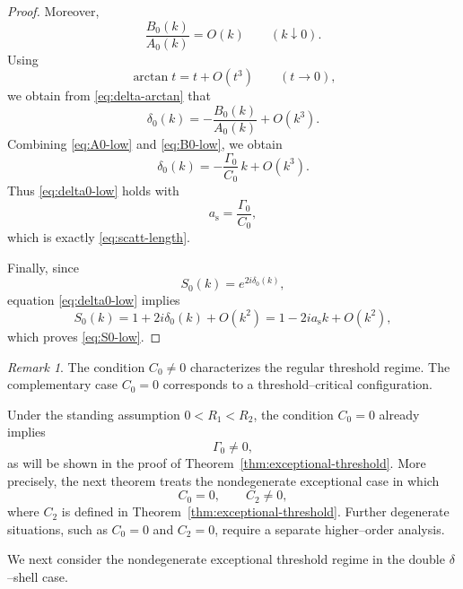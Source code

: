 \documentclass[a4paper,11pt]{article}
\numberwithin{equation}{section}
\theoremstyle{definition}
\theoremstyle{remark}
\newtheorem{rem}[thm]{Remark}
\begin{document}
\begin{proof}
Moreover,
$$
\frac{B_0(k)}{A_0(k)}=O(k)
\qquad (k\downarrow0).
$$
Using
$$
\arctan t=t+O(t^3)
\qquad (t\to0),
$$
we obtain from \eqref{eq:delta-arctan} that
\begin{equation}\label{eq:arg-expand}
\delta_0(k)
=
-\frac{B_0(k)}{A_0(k)}+O(k^3).
\end{equation}
Combining \eqref{eq:A0-low} and \eqref{eq:B0-low}, we obtain
\begin{equation}\label{eq:delta0-low-proof}
\delta_0(k)
=
-\frac{\Gamma_0}{C_0}\,k+O(k^3).
\end{equation}
Thus \eqref{eq:delta0-low} holds with
$$
a_{\mathrm s}=\frac{\Gamma_0}{C_0},
$$
which is exactly \eqref{eq:scatt-length}.

Finally, since
$$
S_0(k)=e^{2i\delta_0(k)},
$$
equation \eqref{eq:delta0-low} implies
$$
S_0(k)=1+2i\delta_0(k)+O(k^2)
=
1-2ia_{\mathrm s}k+O(k^2),
$$
which proves \eqref{eq:S0-low}.
\end{proof}


\begin{rem}
The condition $C_0\neq0$ characterizes the regular threshold regime.
The complementary case $C_0=0$ corresponds to a threshold--critical
configuration.

Under the standing assumption $0<R_1<R_2$, the condition $C_0=0$ already
implies
\[
\Gamma_0\neq0,
\]
as will be shown in the proof of Theorem~\ref{thm:exceptional-threshold}.
More precisely, the next theorem treats the nondegenerate exceptional case in
which
\[
C_0=0,
\qquad
C_2\neq0,
\]
where $C_2$ is defined in Theorem~\ref{thm:exceptional-threshold}.
Further degenerate situations, such as $C_0=0$ and $C_2=0$, require a
separate higher--order analysis.
\end{rem}

We next consider the nondegenerate exceptional threshold regime in the
double $\delta$--shell case.
\end{document}

